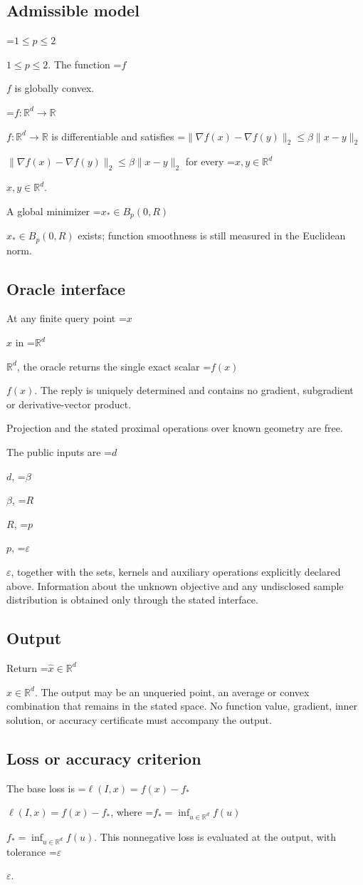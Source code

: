 \documentclass[10pt,a4paper]{article}
\newcommand{\AtlasMath}[1]{\par\begingroup\centering\setbox0=\hbox{$\displaystyle #1$}\ifdim\wd0>1.4\linewidth\typeout{ATLAS WIDE FORMULA: \the\wd0}\fi\ifdim\wd0>\linewidth\resizebox{\linewidth}{!}{\box0}\else\box0\fi\par\endgroup}
\newcommand{\AtlasInlineMath}[1]{\begingroup\setbox0=\hbox{$#1$}\ifdim\wd0>.4\linewidth\endgroup\AtlasMath{#1}\else\endgroup$#1$\fi}
\begin{document}
\subsection{Admissible model}
\AtlasInlineMath{1\le p\le2}. The function \AtlasInlineMath{f} is globally convex.

\AtlasInlineMath{f:\mathbb{R}^d\to\mathbb{R}} is differentiable and satisfies \AtlasInlineMath{\|\nabla f(x)-\nabla f(y)\|_2\le\beta\|x-y\|_2} for every \AtlasInlineMath{x,y\in\mathbb{R}^d}.

A global minimizer \AtlasInlineMath{x_*\in B_p(0,R)} exists; function smoothness is still measured in the Euclidean norm.

\subsection{Oracle interface}
At any finite query point \AtlasInlineMath{x} in \AtlasInlineMath{\mathbb{R}^d}, the oracle returns the single exact scalar \AtlasInlineMath{f(x)}. The reply is uniquely determined and contains no gradient, subgradient or derivative-vector product.

Projection and the stated proximal operations over known geometry are free.

The public inputs are \AtlasInlineMath{d}, \AtlasInlineMath{\beta}, \AtlasInlineMath{R}, \AtlasInlineMath{p}, \AtlasInlineMath{\varepsilon}, together with the sets, kernels and auxiliary operations explicitly declared above. Information about the unknown objective and any undisclosed sample distribution is obtained only through the stated interface.

\subsection{Output}
Return \AtlasInlineMath{\widehat{x}\in \mathbb{R}^d}. The output may be an unqueried point, an average or convex combination that remains in the stated space. No function value, gradient, inner solution, or accuracy certificate must accompany the output.

\subsection{Loss or accuracy criterion}
The base loss is \AtlasInlineMath{\ell(I,x)=f(x)-f_*}, where \AtlasInlineMath{f_*=\inf_{u\in \mathbb{R}^d}f(u)}. This nonnegative loss is evaluated at the output, with tolerance \AtlasInlineMath{\varepsilon}.
\end{document}
